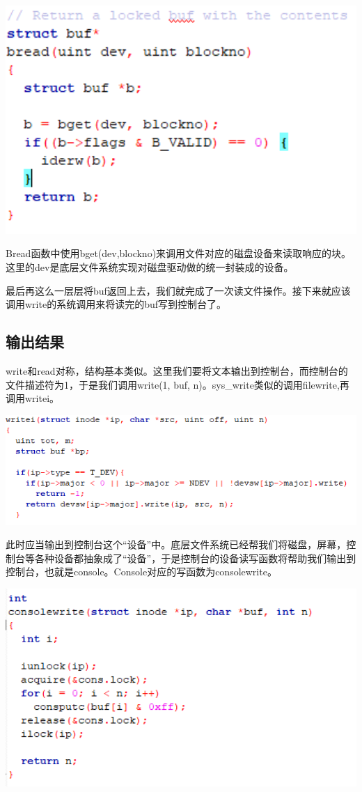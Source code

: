 \includegraphics[width=6in]{figures/eg_file/image179.png}

Bread函数中使用bget(dev,blockno)来调用文件对应的磁盘设备来读取响应的块。这里的dev是底层文件系统实现对磁盘驱动做的统一封装成的设备。

最后再这么一层层将buf返回上去，我们就完成了一次读文件操作。接下来就应该调用write的系统调用来将读完的buf写到控制台了。

\subsection{输出结果}


write和read对称，结构基本类似。这里我们要将文本输出到控制台，而控制台的文件描述符为1，于是我们调用write(1, buf, n)。sys\_write类似的调用filewrite,再调用writei。

\includegraphics[width=6in]{figures/eg_file/image180.png}

此时应当输出到控制台这个“设备”中。底层文件系统已经帮我们将磁盘，屏幕，控制台等各种设备都抽象成了“设备”，于是控制台的设备读写函数将帮助我们输出到控制台，也就是console。Console对应的写函数为consolewrite。

\includegraphics[width=6in]{figures/eg_file/image181.png}

